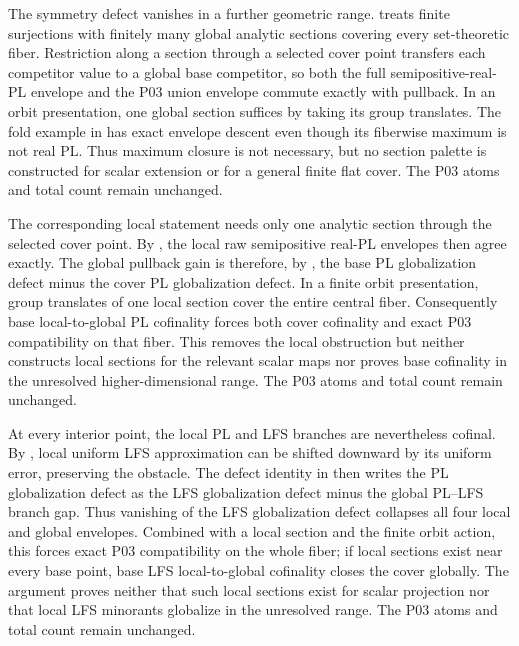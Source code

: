 The symmetry defect vanishes in a further geometric range.
 treats finite surjections
with finitely many global analytic sections covering every set-theoretic
fiber.  Restriction along a section through a selected cover point transfers
each competitor value to a global base competitor, so both the full
semipositive-real-PL envelope and the P03 union envelope commute exactly with
pullback.  In an orbit presentation, one global section suffices by taking
its group translates.  The fold example in
 has exact envelope
descent even though its fiberwise maximum is not real PL.  Thus maximum
closure is not necessary, but no section palette is constructed for scalar
extension or for a general finite flat cover.  The P03 atoms and total count
remain unchanged.

The corresponding local statement needs only one analytic section through
the selected cover point.  By
, the local raw semipositive
real-PL envelopes then agree exactly.  The global pullback gain is therefore,
by , the base PL
globalization defect minus the cover PL globalization defect.  In a finite
orbit presentation, group translates of one local section cover the entire
central fiber.  Consequently base local-to-global PL cofinality forces both
cover cofinality and exact P03 compatibility on that fiber.  This removes the
local obstruction but neither constructs local sections for the relevant
scalar maps nor proves base cofinality in the unresolved higher-dimensional
range.  The P03 atoms and total count remain unchanged.

At every interior point, the local PL and LFS branches are nevertheless
cofinal.  By , local uniform LFS
approximation can be shifted downward by its uniform error, preserving the
obstacle.  The defect identity in  then
writes the PL globalization defect as the LFS globalization defect minus the
global PL--LFS branch gap.  Thus vanishing of the LFS globalization defect
collapses all four local and global envelopes.  Combined with a local section
and the finite orbit action, this forces exact P03 compatibility on the whole
fiber; if local sections exist near every base point, base LFS
local-to-global cofinality closes the cover globally.  The argument proves
neither that such local sections exist for scalar projection nor that local
LFS minorants globalize in the unresolved range.  The P03 atoms and total
count remain unchanged.

